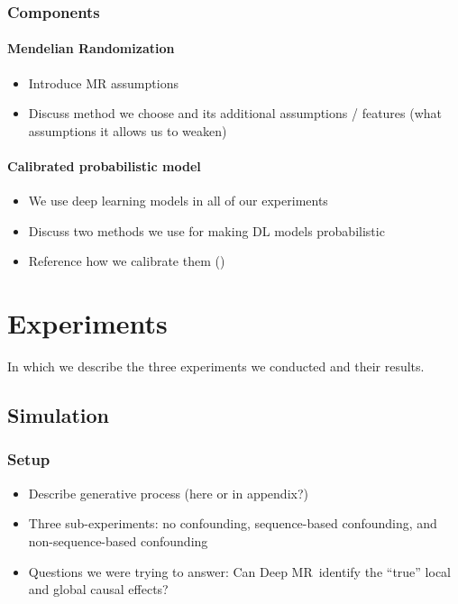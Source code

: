 \documentclass[twoside,11pt]{article}
\newcommand{\method}{{Deep MR}}
\begin{document}
\subsubsection{Components}%
\label{ssub:algo_components}
\paragraph{Mendelian Randomization}%
\label{par:mendelian_randomization}
\begin{itemize}
	\item Introduce MR assumptions
	\item Discuss method we choose and its additional assumptions / features (what assumptions it allows us to weaken)
\end{itemize}

\paragraph{Calibrated probabilistic model}%
\label{par:calibrated_probabilistic_model}
\begin{itemize}
	\item We use deep learning models in all of our experiments
	\item Discuss two methods we use for making DL models probabilistic
	\item Reference how we calibrate them (\cite{kuleshov2018accurate})
\end{itemize}

\section{Experiments}%
\label{sec:experiments}
In which we describe the three experiments we conducted and their results.

\subsection{Simulation}%
\label{sub:simulation}
\subsubsection{Setup}%
\label{ssub:sim_setup}

\begin{itemize}
	\item Describe generative process (here or in appendix?)
	\item Three sub-experiments: no confounding, sequence-based confounding, and non-sequence-based confounding
	\item Questions we were trying to answer:
		\subitem Can \method\ identify the ``true'' local and global causal effects?
\end{itemize}
\end{document}
